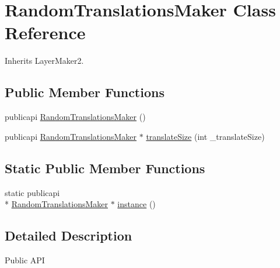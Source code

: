 \hypertarget{classRandomTranslationsMaker}{\section{Random\-Translations\-Maker Class Reference}
\label{classRandomTranslationsMaker}
}


Inherits Layer\-Maker2.

\subsection*{Public Member Functions}
\begin{DoxyCompactItemize}
\item 
publicapi \hyperlink{classRandomTranslationsMaker_a1dc31c5a5846cb6d98a75ec7da4daea1}{Random\-Translations\-Maker} ()
\item 
publicapi \hyperlink{classRandomTranslationsMaker}{Random\-Translations\-Maker} $\ast$ \hyperlink{classRandomTranslationsMaker_a66bf571e71001ce41a08fd80ed328920}{translate\-Size} (int \-\_\-translate\-Size)
\end{DoxyCompactItemize}
\subsection*{Static Public Member Functions}
\begin{DoxyCompactItemize}
\item 
static publicapi \\*
\hyperlink{classRandomTranslationsMaker}{Random\-Translations\-Maker} $\ast$ \hyperlink{classRandomTranslationsMaker_a69ccda5923d035f84bd0830489459d81}{instance} ()
\end{DoxyCompactItemize}


\subsection{Detailed Description}
\begin{DoxyParagraph}{Public A\-P\-I}

\end{DoxyParagraph}


